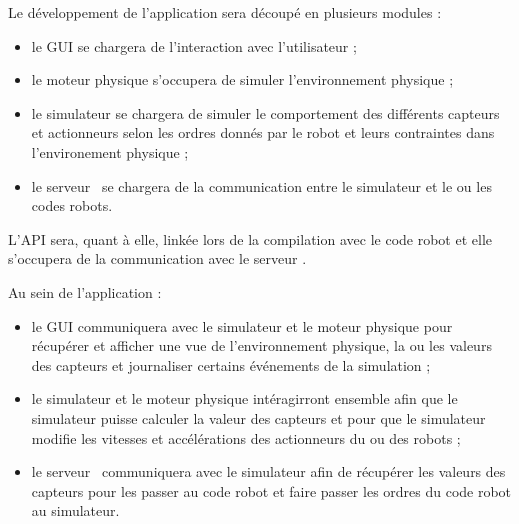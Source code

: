 Le développement de l'application sera découpé en plusieurs modules :
\begin{itemize}
    \item le GUI se chargera de l'interaction avec l'utilisateur ;
    \item le moteur physique s'occupera de simuler l'environnement physique ;
    \item le simulateur se chargera de simuler le comportement des différents capteurs et actionneurs selon les ordres donnés par le robot et leurs contraintes dans l'environement physique ;
    \item le \og serveur \fg\ se chargera de la communication entre le simulateur et le ou les codes robots.
\end{itemize}

L'API sera, quant à elle, linkée lors de la compilation avec le code robot et elle s'occupera de la communication avec le \og serveur \fg.

Au sein de l'application :
\begin{itemize}
    \item le GUI communiquera avec le simulateur et le moteur physique pour récupérer et afficher une vue de l'environnement physique, la ou les valeurs des capteurs et journaliser certains événements de la simulation ;
    \item le simulateur et le moteur physique intéragirront ensemble afin que le simulateur puisse calculer la valeur des capteurs et pour que le simulateur modifie les vitesses et accélérations des actionneurs du ou des robots ;
    \item le \og serveur \fg\ communiquera avec le simulateur afin de récupérer les valeurs des capteurs pour les passer au code robot et faire passer les ordres du code robot au simulateur.
\end{itemize}